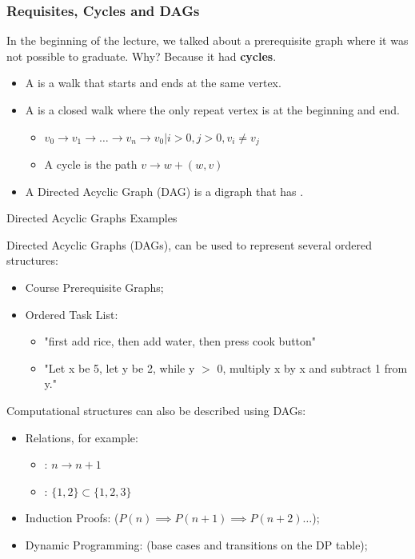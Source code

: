 \begin{frame}
  \frametitle{Requisites, Cycles and DAGs}

  In the beginning of the lecture, we talked about a prerequisite graph where it was not possible to graduate. Why? Because it had {\bf cycles}.\medskip

    \begin{itemize}
    \item A  is a walk that starts and ends at the same vertex.\medskip

    \item A  is a closed walk where the only repeat
      vertex is at the beginning and end.
      \begin{itemize}
        \item $v_0 \to v_1 \to \ldots \to v_n \to v_0 | i > 0, j > 0, v_i \neq v_j$
        \item A cycle is the path $v \to w + (w,v)$
      \end{itemize}\medskip

    \item A \alert{Directed Acyclic Graph (DAG)} is a digraph that has
      .
    \end{itemize}
\end{frame}

\begin{frame}{Directed Acyclic Graphs Examples}

  Directed Acyclic Graphs (DAGs), can be used to represent several ordered structures:

    \begin{itemize}
      \item Course Prerequisite Graphs;
      \item Ordered Task List:
      \begin{itemize}
        \item "first add rice, then add water, then press cook button"
        \item "Let x be 5, let y be 2, while y $>$ 0, multiply x by x and subtract 1 from y."
      \end{itemize}
    \end{itemize}
    \bigskip

  Computational structures can also be described using DAGs:\medskip

    \begin{itemize}
      \item Relations, for example:
      \begin{itemize}
        \item {}: $n \to n+1$
        \item {}: $\{1,2\} \subset \{1,2,3\}$
      \end{itemize}
      \item Induction Proofs: ($P(n) \implies P(n+1) \implies P(n+2) \ldots$);
      \item Dynamic Programming: (base cases and transitions on the DP table);
    \end{itemize}
\end{frame}

